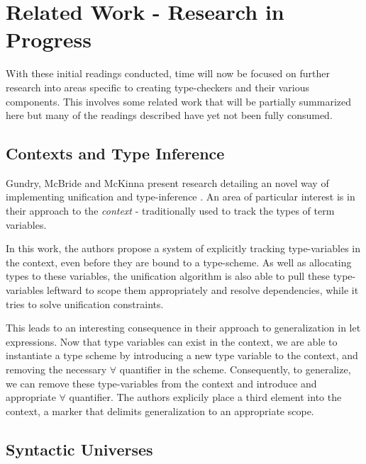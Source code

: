 \documentclass{ProgressReport}[2020/09/15]
\begin{document}
          \section{Related Work - Research in Progress}

          With these initial readings conducted, time will now be focused on
          further research into areas specific to creating
          type-checkers and their various components. This involves
          some related work that will be partially summarized here but
          many of the readings described have yet not been fully
          consumed.

          \subsection{Contexts and Type Inference}

          Gundry, McBride and McKinna present research detailing an
          novel way of implementing unification and
          type-inference \cite{TypeInferenceInContext}. An area of
          particular interest is in their approach to the
          \emph{context} - traditionally used to track the types of
          term variables.

          In this work, the authors propose a system of explicitly
          tracking type-variables in the context, even before they are
          bound to a type-scheme. As well as allocating types
          to these variables, the unification algorithm is also
          able to pull these type-variables leftward to scope them
          appropriately and resolve dependencies, while it tries to
          solve unification constraints.

          This leads to an interesting consequence in their approach to
          generalization in let expressions. Now that type variables
          can exist in the context, we are able to instantiate a type
          scheme by introducing a new type variable to the context,
          and removing the necessary $\forall$ quantifier in the
          scheme. Consequently, to generalize, we can remove these
          type-variables from the context and introduce and
          appropriate $\forall$ quantifier. The authors explicily
          place a third element into the context, a marker that delimits
          generalization to an appropriate scope.

          \subsection{Syntactic Universes}
\end{document}
